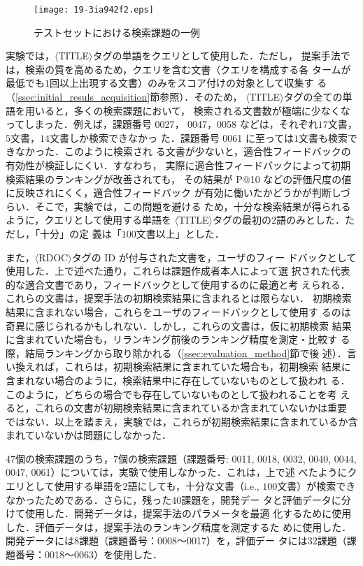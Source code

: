 \documentclass[japanese]{jnlp_1.4}
\begin{document}
\begin{figure}[t]
 \begin{center}
\texttt{[image: 19-3ia942f2.eps]}
\end{center}
\caption{テストセットにおける検索課題の一例}
\label{fig:ntcir_subject}
\end{figure}

実験では，$\langle$TITLE$\rangle$タグの単語をクエリとして使用した．ただし，
提案手法では，検索の質を高めるため，クエリを含む文書（クエリを構成する各
タームが最低でも$1$回以上出現する文書）のみをスコア付けの対象として収集す
る（\ref{ssec:initial_resuls_acquisition}節参照）．そのため，
$\langle$TITLE$\rangle$タグの全ての単語を用いると，多くの検索課題において，
検索される文書数が極端に少なくなってしまった．例えば，課題番号 0027，
0047，0058 などは，それぞれ$17$文書，$5$文書，$14$文書しか検索できなかっ
た．課題番号 0061 に至っては$1$文書も検索できなかった．このように検索され
る文書が少ないと，適合性フィードバックの有効性が検証しにくい．すなわち，
実際に適合性フィードバックによって初期検索結果のランキングが改善されても，
その結果が P@10 などの評価尺度の値に反映されにくく，適合性フィードバック
が有効に働いたかどうかが判断しづらい．そこで，実験では，この問題を避ける
ため，十分な検索結果が得られるように，クエリとして使用する単語を
$\langle$TITLE$\rangle$タグの最初の$2$語のみとした．ただし，「十分」の定
義は「$100$文書以上」とした．

また，$\langle$RDOC$\rangle$タグの ID が付与された文書を，ユーザのフィー
ドバックとして使用した．上で述べた通り，これらは課題作成者本人によって選
択された代表的な適合文書であり，フィードバックとして使用するのに最適と考
えられる．これらの文書は，提案手法の初期検索結果に含まれるとは限らない．
初期検索結果に含まれない場合，これらをユーザのフィードバックとして使用す
るのは奇異に感じられるかもしれない．しかし，これらの文書は，仮に初期検索
結果に含まれていた場合も，リランキング前後のランキング精度を測定・比較す
る際，結局ランキングから取り除かれる（\ref{ssec:evaluation_method}節で後
述）．言い換えれば，これらは，初期検索結果に含まれていた場合も，初期検索
結果に含まれない場合のように，検索結果中に存在していないものとして扱われ
る．このように，どちらの場合でも存在していないものとして扱われることを考
えると，これらの文書が初期検索結果に含まれているか含まれていないかは重要
ではない．以上を踏まえ，実験では，これらが初期検索結果に含まれているか含
まれていないかは問題にしなかった．

$47$個の検索課題のうち，$7$個の検索課題（課題番号: 0011, 0018, 0032,
0040, 0044, 0047, 0061）については，実験で使用しなかった．これは，上で述
べたようにクエリとして使用する単語を$2$語にしても，十分な文書（i.e.,
$100$文書）が検索できなかったためである．さらに，残った$40$課題を，開発デー
タと評価データに分けて使用した．開発データは，提案手法のパラメータを最適
化するために使用した．評価データは，提案手法のランキング精度を測定するた
めに使用した．開発データには$8$課題（課題番号：0008〜0017）を，評価デー
タには$32$課題（課題番号：0018〜0063）を使用した．
\end{document}
